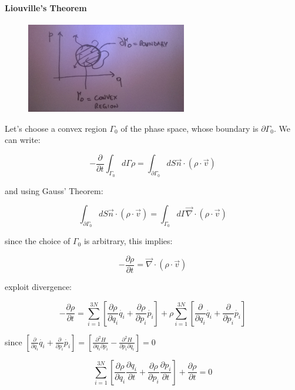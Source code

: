 \documentclass[a4paper, italian, openany]{book}
\begin{document}
\paragraph{Liouville's Theorem}

\begin{figure}[H]
\centering
\includegraphics[width=70mm]{img/figure3.jpg}
\end{figure}

Let's choose a convex region $\Gamma_0$ of the phase space, whose boundary is $\partial \Gamma_0$. We can write:

$$-\frac{\partial}{\partial t} \int_{\Gamma_0} d\Gamma \rho = \int_{\partial \Gamma_0} dS \overrightarrow{n} \cdot (\rho \cdot \overrightarrow{v})$$

and using Gauss' Theorem:

$$\int_{\partial \Gamma_0} dS \overrightarrow{n} \cdot (\rho \cdot \overrightarrow{v}) =  \int_{\Gamma_0} d\Gamma \overrightarrow{\nabla} \cdot (\rho \cdot \overrightarrow{v})$$

since the choice of $\Gamma_0$ is arbitrary, this implies:

$$-\frac{\partial \rho}{\partial t} = \overrightarrow{\nabla} \cdot (\rho \cdot \overrightarrow{v})$$

exploit divergence:

$$-\frac{\partial \rho}{\partial t} = \sum_{i=1}^{3N} \left [ \frac{\partial \rho}{\partial q_i}\dot{q_i} + \frac{\partial \rho}{\partial p_i} \dot{p_i} \right ] + \rho \sum_{i=1}^{3N} \left [ \frac{\partial}{\partial q_i}\dot{q_i} + \frac{\partial}{\partial p_i} \dot{p_i} \right ]$$

since $\left [ \frac{\partial}{\partial q_i}\dot{q_i} + \frac{\partial}{\partial p_i} \dot{p_i} \right ] = \left [ \frac{\partial^2 H}{\partial q_i \partial p_i} - \frac{\partial^2 H}{\partial p_i \partial q_i} \right ] = 0$

$$\sum_{i=1}^{3N} \left [ \frac{\partial \rho}{\partial q_i} \frac{\partial q_i}{\partial t} + \frac{\partial \rho}{\partial p_i} \frac{\partial p_i}{\partial t} \right ] + \frac{\partial \rho}{\partial t} = 0$$
\end{document}
